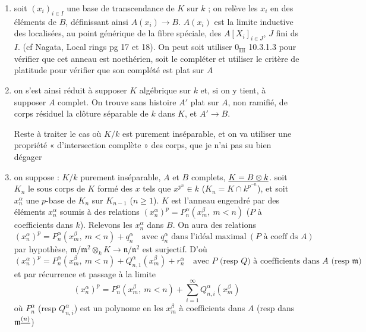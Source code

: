 \documentclass[11pt,a4paper]{article}
\begin{document}
\begin{enumerate}
  \item[a)] soit $(x_i)_{i \in I}$ une base de transcendance de $K$ sur $k$ ;
     on relève les $x_i$ en des éléments de $B$, définissant ainsi
    $A(x_i) \to B$. $A(x_i)$ est la limite inductive des localisées, au point
    générique de la fibre spéciale, des $A[X_i]_{i \in J}$, $J$ fini ds $I$.
    (cf Nagata, Local rings pg 17 et 18). On peut soit utiliser $0_{\mathrm{III}}$
    10.3.1.3 pour vérifier que cet anneau est noethérien, soit le compléter et
    utiliser le critère de platitude pour vérifier que son complété est plat
    sur $A$
  \item[b)] on s'est ainsi réduit à supposer $K$ algébrique sur $k$ et, si on y
    tient, à supposer $A$ complet. On trouve sans histoire $A'$ plat sur $A$,
    non ramifié, de corps résiduel la clôture séparable de $k$ dans $K$, et
    $A' \to B$.

    Reste à traiter le cas où $K/k$ est purement inséparable, et on va
    utiliser une propriété « d'intersection complète » des corps, que je n'ai
    pas su bien dégager
  \item[c)] on suppose : $K/k$ purement inséparable, $A$ et $B$ complets,
    $\uncertain{K = B \otimes k}$.
    soit $K_n$ le sous corps de $K$ formé des $x$ tels que $x^{p^n} \in k$
    ($K_n = K \cap k^{p^{-n}}$), et soit $x_n^\alpha$ une $p$-base de $K_n$
    sur $K_{n-1}$ ($n \geqslant 1$). $K$ est l'anneau engendré par des
    éléments $x_n^\alpha$ soumis à des relations
    $(x_n^\alpha)^p = P_n^\alpha(x_m^\beta,\ m < n)$ ($P$ à coefficients
    dans $k$). Relevons les $x_n^\alpha$ dans $B$. On aura des relations
    \[
      (x_n^\alpha)^p = P_n^\alpha(x_m^\beta,\ m < n) + q_n^\alpha
      \quad \text{avec } q_n^\alpha \text{ dans l'idéal maximal}
      \ (P \text{ à coeff ds } A)
    \]
    par hypothèse, $\mathfrak{m}/\mathfrak{m}^2 \otimes_k K \to \mathfrak{n}/\mathfrak{n}^2$
    est surjectif. D'où
    \[
      (x_n^\alpha)^p = P_n^\alpha(x_m^\beta,\ m < n) + Q_{n,1}^\alpha(x_m^\beta) + r_n^\alpha
      \quad \text{avec } P \text{ (resp } Q) \text{ à coefficients dans } A \text{ (resp } \mathfrak{m})
    \]
    et par récurrence et passage à la limite
    \[
      \boxed{\,(x_n^\alpha)^p = P_n^\alpha(x_m^\beta,\ m < n) + \sum_{i=1}^{\infty} Q_{n,i}^\alpha(x_m^\beta)\,}
    \]
    où $P_n^\alpha$ (resp $Q_{n,i}^\alpha$) est un polynome en les $x_m^\beta$
    à coefficients dans $A$ (resp dans $\mathfrak{m}^{\uncertain{(n)}}$)


\end{enumerate}
\end{document}
